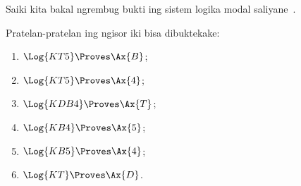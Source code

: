 \documentclass[../../../include/open-logic-section]{subfiles}
\begin{document}


Saiki kita bakal ngrembug bukti ing sistem logika modal saliyane~.

\begin{prop}
Pratelan-pratelan ing ngisor iki bisa dibuktekake:
  \begin{enumerate}
  \item $\Log{KT5} \Proves \Ax{B}$;
  \item $\Log{KT5} \Proves \Ax{4}$;
  \item $\Log{KDB4} \Proves \Ax{T}$;
  \item $\Log{KB4} \Proves \Ax{5}$;
  \item $\Log{KB5} \Proves \Ax{4}$;
  \item {}$\Log{KT} \Proves \Ax{D}$.
  \end{enumerate}
\end{prop}
\end{document}
